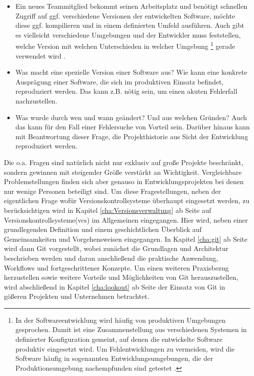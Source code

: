 \begin{itemize}
  \item Ein neues Teammitglied bekommt seinen Arbeitsplatz und ben\"otigt
  schnellen Zugriff auf ggf. verschiedene Versionen der entwickelten Software,
  m\"ochte diese ggf. kompilieren und in einem definierten Umfeld ausf\"uhren.
  Auch gibt es vielleicht verschiedene Umgebungen und der Entwickler muss
  feststellen, welche Version mit welchen Unterschieden in welcher \gls{Umgebung}
  \footnote{\label{umgebung:1}In der Softwareentwicklung wird häufig von
  produktiven Umgebungen gesprochen. Damit ist eine Zusammenstellung aus
  verschiedenen Systemen in definierter Konfiguration gemeint, auf denen die
  entwickelte Software produktiv eingesetzt wird. Um Fehlentwicklungen zu
  vermeiden, wird die Software häufig in sogenannten Entwicklungsumgebungen,
  die der Produktionsumgebung nachempfunden sind getestet \cite[S.~49,
  250]{cd}.} gerade verwendet wird \citep[S.~26]{cd}.
  \item Was macht eine spezielle Version einer Software aus?  Wie kann eine
  konkrete Auspr\"agung einer Software, die sich im produktiven Einsatz
  befindet, reproduziert werden. Das kann z.B. n\"otig sein, um einen akuten
  Fehlerfall nachzustellen\cite[s.~33]{cd}.
  \item Was wurde durch wen und wann ge\"andert? Und aus welchen Gr\"unden?
  Auch das kann f\"ur den Fall einer Fehlersuche von Vorteil sein. Darüber
  hinaus kann mit Beantwortung dieser Frage, die Projekthistorie aus Sicht der
  Entwicklung reproduziert werden\cite[S.~33]{cd}.
\end{itemize}
Die o.a. Fragen sind natürlich nicht nur exklusiv auf große Projekte
beschränkt, sondern gewinnen mit steigender Größe verstärkt an Wichtigkeit.
Vergleichbare Problemstellungen finden sich aber genauso in
Entwicklungsprojekten bei denen nur wenige Personen beteiligt sind. Um diese
Fragestellungen, neben der eigentlichen Frage wofür Versionskontrollsysteme
überhaupt eingesetzt werden, zu berücksichtigen wird in Kapitel
\ref{cha:Versionsverwaltung} ab Seite \pageref{cha:Versionsverwaltung} auf
Versionskontrollsysteme(\acrshort{vcs}) im Allgemeinen eingegangen. Hier wird,
neben einer grundlegenden Definition und einem geschichtlichen Überblick auf
Gemeinsamkeiten und Vorgehensweisen eingegangen. In Kapitel \ref{cha:git} ab
Seite \pageref{cha:git} wird dann Git vorgestellt, wobei zunächst die
Grundlagen und Architektur beschrieben werden und daran anschließend die
praktische Anwendung, Workflows und fortgeschrittener Konzepte. Um einen
weiteren Praxisbezug herzustellen sowie weitere Vorteile und Möglichkeiten von
Git herauszustellen, wird abschließend in Kapitel \ref{cha:lookout} ab Seite
\pageref{cha:lookout} der Einsatz von Git in gößeren Projekten und Unternehmen
betrachtet.
